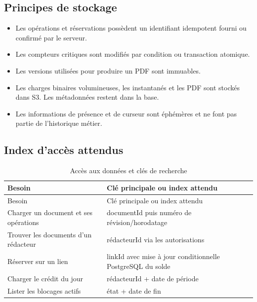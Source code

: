 \subsection{Principes de stockage}

\begin{itemize}
\item Les opérations et réservations possèdent un identifiant idempotent fourni ou confirmé par le serveur.
\item Les compteurs critiques sont modifiés par condition ou transaction atomique.
\item Les versions utilisées pour produire un PDF sont immuables.
\item Les charges binaires volumineuses, les instantanés et les PDF sont stockés dans S3. Les métadonnées restent dans la base.
\item Les informations de présence et de curseur sont éphémères et ne font pas partie de l'historique métier.
\end{itemize}

\subsection{Index d'accès attendus}

\begingroup\small\setlength{\tabcolsep}{3pt}\renewcommand{\arraystretch}{1.25}
\begin{longtable}{|P{0.26\textwidth}|P{0.69\textwidth}|}
\caption{Accès aux données et clés de recherche}\\
\hline
Besoin & Clé principale ou index attendu \\ \hline
\endfirsthead
\hline
Besoin & Clé principale ou index attendu \\ \hline
\endhead
\endfoot

Charger un document et ses opérations & documentId puis numéro de révision/horodatage \\ \hline

Trouver les documents d'un rédacteur & rédacteurId via les autorisations \\ \hline

Réserver sur un lien & linkId avec mise à jour conditionnelle PostgreSQL du solde \\ \hline

Charger le crédit du jour & rédacteurId + date de période \\ \hline

Lister les blocages actifs & état + date de fin \\ \hline

\end{longtable}\endgroup

